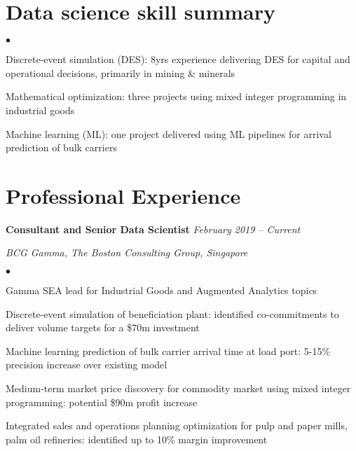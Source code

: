 \documentclass[margin,line]{resume}
\newenvironment{list1}{
  \begin{list}{}{%
      \setlength{\itemsep}{0in}
      \setlength{\parsep}{0in} \setlength{\parskip}{0in}
      \setlength{\topsep}{0in} \setlength{\partopsep}{0in}
      \setlength{\leftmargin}{0.17in}}}{\end{list}}
\newenvironment{list2}{
  \begin{list}{$\bullet$}{%
      \setlength{\itemsep}{0in}
      \setlength{\parsep}{0in} \setlength{\parskip}{0in}
      \setlength{\topsep}{0in} \setlength{\partopsep}{0in}
      \setlength{\leftmargin}{0.2in}}}{\end{list}}
\begin{document}
\begin{resume}
\section{\sc Data science skill summary}
\begin{list2}
\item Discrete-event simulation (DES): 8yrs experience delivering DES for capital and operational decisions, primarily in mining \& minerals
\item Mathematical optimization: three projects using mixed integer programming in industrial goods
\item Machine learning (ML): one project delivered using ML pipelines for arrival prediction of bulk carriers
\end{list2}

\section{\sc Professional Experience}
{\textbf{Consultant and Senior Data Scientist}} \hfill {\it February 2019 -- Current}\\
\vspace{-0.85\baselineskip}
\begin{list1}
\item {\it BCG Gamma, The Boston Consulting Group, Singapore}
\begin{list2}
\item Gamma SEA lead for Industrial Goods and Augmented Analytics topics
\item Discrete-event simulation of beneficiation plant: identified co-commitments to deliver volume targets for a \$70m investment 
\item Machine learning prediction of bulk carrier arrival time at load port: 5-15\% precision increase over existing model
\item Medium-term market price discovery for commodity market using mixed integer programming: potential \$90m profit increase
\item Integrated sales and operations planning optimization for pulp and paper mills, palm oil refineries: identified up to 10\% margin improvement 
\end{list2}
\end{list1}



\end{resume}
\end{document}
